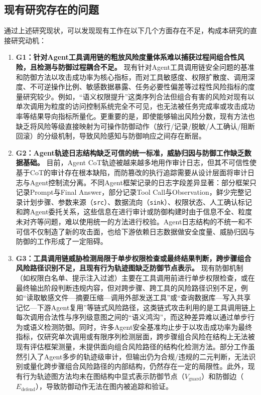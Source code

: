 \subsection{现有研究存在的问题}

通过上述研究现状，可以发现现有工作在以下几个方面存在不足，构成本研究的直接研究动机：

\begin{enumerate}
  \item \textbf{G1：针对Agent工具调用链的粗放风险度量体系难以捕获过程间组合性风险，且检测与防御过程耦合不足。}
  现有针对Agent工具调用链安全问题的基准和防御方法以攻击成功率为核心指标，而对工具敏感度、权限扩散度、调用深度、不可逆操作比例、敏感数据暴露、任务必要性偏差等过程性风险指标的度量研究较少。例如，“语义权限提升”这类序列合法但组合有害的风险对现有以单次调用为粒度的访问控制系统完全不可见，也无法被任务完成率或攻击成功率等结果导向指标所量化。更重要的是，即使能够输出风险分数，现有方法也缺乏将风险等级直接映射为可操作防御动作（放行/记录/脱敏/人工确认/阻断回滚）的分级机制，导致风险感知与防御响应之间存在断层。

  \item \textbf{G2：Agent轨迹日志结构缺乏可信的统一标准，威胁归因与防御工作缺乏数据基础。}
  目前，Agent CoT轨迹被越来越多地用作审计日志，但其不可信性使基于CoT的审计存在根本缺陷，而防篡改的执行追踪需要从设计层面将审计日志与Agent控制流分离\cite{chu2026systematic,dehghantanha2026sokattacksurfaceagentic}。不同Agent框架记录的日志字段差异显著：部分框架只记录Prompt与Final Answer，部分记录Tool Call与Observation，鲜少完整记录计划步骤、参数来源（\texttt{src}）、数据流向（\texttt{sink}）、权限状态、人工确认标记和跨Agent委托关系\cite{chan2024visibility,microsoft2025taxonomy,wang2026fromagenttraces}，这些信息在进行审计或防御构建时由于信息不全、粒度未对齐等问题，难以使用统一的方法进行校验。Agent日志结构的不统一和不可信不仅制造了新的攻击面，也给下游依赖日志数据做安全度量、威胁归因与防御的工作形成了一定阻碍。

  \item \textbf{G3：工具调用链威胁检测局限于单步权限检查或最终结果判断，跨步骤组合风险路径识别不足，且现有行为轨迹图缺乏防御节点表示。}
  现有防御机制（如权限白名单、提示注入过滤）主要在工具调用前进行单步权限检查，或在最终输出阶段判断违规内容，但对跨步骤、跨工具的风险路径识别不足，例如“读取敏感文件—摘要压缩—调用外部发送工具”或“查询数据库—写入共享记忆—下游Agent复用”等链式风险路径\cite{dewitt2026openchallenges,debenedetti2025camel,costa2025fides}，这类链式攻击利用的是工具调用链上每次调用合法性与序列级意图之间的“语义鸿沟”，而这种差异难以通过单步行为或语义检测防御。同时，许多Agent安全基准均止步于以攻击成功率为最终指标，仅研究单次调用或有限序列检测层面，跨步骤组合风险在结构上无法被现有评估框架测量，未提供面向组合风险路径的结构化检测方法\cite{zhang2024injectagent,liu2024formalizing,chu2026systematic}。部分工作\cite{wang2025agentarmor,liu2026auditing}虽然引入了Agent多步的轨迹级审计，但输出仍为合规/违规的二元判断，无法识别或量化跨步骤组合风险路径的内部结构，仍然存在一定的局限性。此外，现有行为轨迹图方法\cite{he2025sentinelagent,wang2026authgraph}均未在图结构中显式表示防御节点（$V_{\text{guard}}$）和防御边（$E_{\text{defend}}$），导致防御动作无法在图内被追踪和验证。


\end{enumerate}
